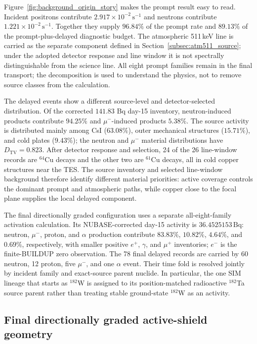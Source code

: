 \documentclass[11pt]{article}
\newcommand{\cps}{\ensuremath{\,\mathrm{s^{-1}}}}
\begin{document}
Figure~\ref{fig:background_origin_story} makes the prompt result easy to read.
Incident positrons contribute $2.917\times10^{-2}\cps$ and neutrons contribute
$1.221\times10^{-2}\cps$. Together they supply $96.84\%$ of the prompt rate
and $89.13\%$ of the prompt-plus-delayed diagnostic budget. The atmospheric
511\,keV line is carried as the separate component defined in
Section~\ref{subsec:atm511_source}; under the adopted detector response and line
window it is not spectrally distinguishable from the science line.
All eight prompt families remain in the final transport; the decomposition is used
to understand the physics, not to remove source classes from the calculation.

The delayed events show a different source-level and detector-selected
distribution. Of the corrected $141.83$ Bq day-15 inventory, neutron-induced
products contribute $94.25\%$ and $\mu^-$-induced products $5.38\%$. The source
activity is distributed mainly among CsI ($63.08\%$), outer mechanical
structures ($15.71\%$), and cold plates ($9.43\%$); the neutron and $\mu^-$
material distributions have $D_{\mathrm{TV}}=0.823$. After detector response and
selection, 24 of the 26 line-window records are $^{64}$Cu decays and the other
two are $^{61}$Cu decays, all in cold copper structures near the TES. The
source inventory and selected line-window background therefore identify
different material priorities: active coverage controls the dominant prompt and
atmospheric paths, while copper close to the focal plane supplies the local
delayed component.

The final directionally graded configuration uses a separate all-eight-family
activation calculation.
Its NUBASE-corrected day-15 activity is $36.4525153\,\mathrm{Bq}$: neutron,
$\mu^-$, proton, and $\alpha$ production contribute $83.83\%$, $10.82\%$,
$4.64\%$, and $0.69\%$, respectively, with smaller positive $e^+$, $\gamma$,
and $\mu^+$ inventories; $e^-$ is the finite-BUILDUP zero observation. The 78
final delayed records are carried by 60 neutron, 12 proton, five $\mu^-$, and one
$\alpha$ event. Their time fold is resolved jointly by incident family and
exact-source parent nuclide. In particular, the one SIM lineage that starts as
$^{182}$W is assigned to its position-matched radioactive $^{182}$Ta source
parent rather than treating stable ground-state $^{182}$W as an activity.

\FloatBarrier

\subsection{Final directionally graded active-shield geometry}
\label{subsec:optimized_shield_results}
\end{document}
